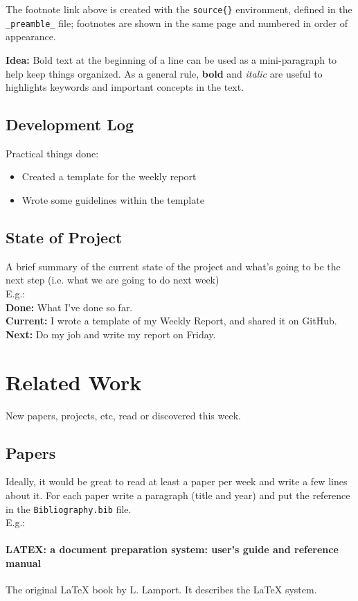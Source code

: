 The footnote link above is created with the \verb|source{}| environment, defined in the \verb|_preamble_| file;
footnotes are shown in the same page and numbered in order of appearance.

\textbf{Idea:} Bold text at the beginning of a line can be used as a mini-paragraph to help keep things organized.
As a general rule, \textbf{bold} and \textit{italic} are useful to highlights keywords and important concepts in the text.
%
\subsection{Development Log}
Practical things done:
\begin{itemize}
  \item Created a template for the weekly report
  \item Wrote some guidelines within the template
\end{itemize}
%
\subsection{State of Project}
A brief summary of the current state of the project and what's going to be the next step (i.e. what we are going to do next week)\\
E.g.:\\
%
\noindent
\textbf{Done:} What I've done so far.\\
\textbf{Current:} I wrote a template of my Weekly Report, and shared it on GitHub.\\
\textbf{Next:} Do my job and write my report on Friday.
%

\section{Related Work}
New papers, projects, etc, read or discovered this week.
\subsection{Papers}
Ideally, it would be great to read at least a paper per week and write a few lines about it. For each paper write a paragraph (title and year) and put the reference in the \verb|Bibliography.bib| file.\\
E.g.:
\paragraph{LATEX: a document preparation system: user's guide and reference manual}\cite{lamport1994latex} The original LaTeX book  by L. Lamport. It describes the LaTeX system.

